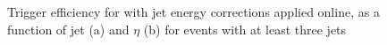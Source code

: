 \begin{figure}[hbtp]
  \centering
  \hfill
  \caption[Trigger efficiency for \HLTThreeCentralPFJet as a function of jet \pt and $\eta$]{Trigger efficiency for
  \HLTThreeCentralPFJet with jet energy corrections applied online, as a function of jet \pt (a) and $\eta$ (b) for events
  with at least three jets}
\label{fig:top_hlt_pt_eta_JEC_3jets} 
\end{figure}

